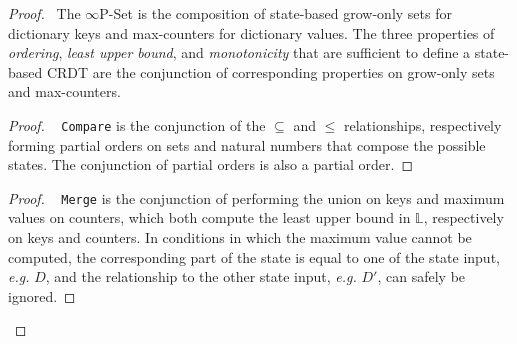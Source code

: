\documentclass[11pt, oneside]{article}   	%
\begin{document}
\begin{proof}
	\pfsketch ~The $\infty$P-Set is the composition of state-based grow-only sets for dictionary keys and max-counters for dictionary values. The three properties of \textit{ordering}, \textit{least upper bound}, and \textit{monotonicity} that are sufficient to define a state-based CRDT are the conjunction of corresponding properties on grow-only sets and max-counters.
	
	\label{proof:state-crdt}
	\begin{proof}
		\pfsketch~ \texttt{Compare} is the conjunction of the $\subseteq$ and $\leq$ relationships, respectively forming partial orders on sets and natural numbers that compose the possible states. The conjunction of partial orders is also a partial order.		
	\end{proof}
% 
%
	
	\begin{proof}
			\pfsketch~ \texttt{Merge} is the conjunction of performing the union on keys and maximum values on counters, which both compute the least upper bound in $\mathds{L}$, respectively on keys and counters. In conditions in which the maximum value cannot be computed, the corresponding part of the state is equal to one of the state input, \textit{e.g.} $D$, and the relationship to the other state input, \textit{e.g.} $D'$, can safely be ignored.
	\end{proof}


\end{proof}
\end{document}
